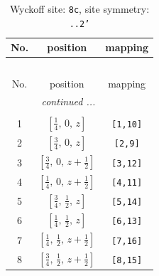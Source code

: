 \documentclass[fleqn,8pt]{jsarticle}
\begin{document}
\begin{longtable}{ccc}
\caption{Wyckoff site: {\tt 8c}, site symmetry: {\tt ..2'}}
 \\
 \hline \hline
No. & position & mapping \\ \hline \endfirsthead

\multicolumn{2}{l}{\tablename\ \thetable{}} \\
 \hline \hline
No. & position & mapping \\ \hline \endhead

 \hline \hline
\multicolumn{2}{r}{\footnotesize\it continued ...} \\ \endfoot

 \hline \hline
\multicolumn{2}{r}{} \\ \endlastfoot

1 & $\left[ \frac{1}{4},\, 0,\, z \right]$ & {\tt [1,10]} \\ \hline
2 & $\left[ \frac{3}{4},\, 0,\, z \right]$ & {\tt [2,9]} \\ \hline
3 & $\left[ \frac{3}{4},\, 0,\, z + \frac{1}{2} \right]$ & {\tt [3,12]} \\ \hline
4 & $\left[ \frac{1}{4},\, 0,\, z + \frac{1}{2} \right]$ & {\tt [4,11]} \\ \hline
5 & $\left[ \frac{3}{4},\, \frac{1}{2},\, z \right]$ & {\tt [5,14]} \\ \hline
6 & $\left[ \frac{1}{4},\, \frac{1}{2},\, z \right]$ & {\tt [6,13]} \\ \hline
7 & $\left[ \frac{1}{4},\, \frac{1}{2},\, z + \frac{1}{2} \right]$ & {\tt [7,16]} \\ \hline
8 & $\left[ \frac{3}{4},\, \frac{1}{2},\, z + \frac{1}{2} \right]$ & {\tt [8,15]} \\
\end{longtable}
\renewcommand{\arraystretch}{1.2}
\end{document}
